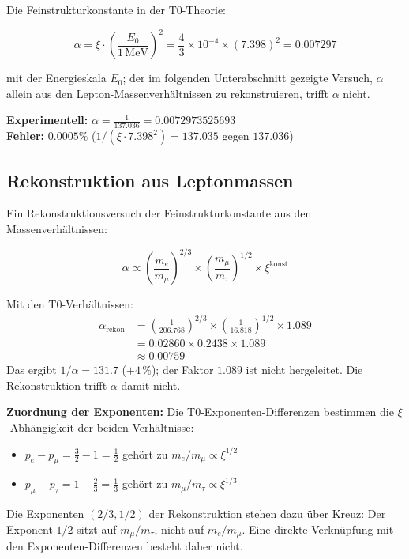 	Die Feinstrukturkonstante in der T0-Theorie:
	
	\begin{equation}
		\alpha = \xi \cdot \left(\frac{E_0}{1\,\text{MeV}}\right)^2 = \frac{4}{3} \times 10^{-4} \times (7.398)^2 = 0.007297
	\end{equation}
	
	mit der Energieskala $E_0$; der im folgenden Unterabschnitt gezeigte Versuch, $\alpha$ allein aus den Lepton-Massenverhältnissen zu rekonstruieren, trifft $\alpha$ nicht.
	
	\textbf{Experimentell:} $\alpha = \frac{1}{137.036} = 0.0072973525693$\\
	\textbf{Fehler:} $0.0005\%$ ($1/(\xi\cdot7.398^2) = 137.035$ gegen $137.036$)
	
	\subsection{Rekonstruktion aus Leptonmassen}
	
	\begin{beweis}
		Ein Rekonstruktionsversuch der Feinstrukturkonstante aus den Massenverhältnissen:
		
		\begin{equation}
			\alpha \propto \left(\frac{m_e}{m_\mu}\right)^{2/3} \times \left(\frac{m_\mu}{m_\tau}\right)^{1/2} \times \xi^{\text{konst}}
		\end{equation}
		
		Mit den T0-Verhältnissen:
		\begin{align}
			\alpha_{\text{rekon}} &= \left(\frac{1}{206.768}\right)^{2/3} \times \left(\frac{1}{16.818}\right)^{1/2} \times 1.089 \\
			&= 0.02860 \times 0.2438 \times 1.089 \\
			&\approx 0.00759
		\end{align}
		Das ergibt $1/\alpha = 131.7$ ($+4\,\%$); der Faktor $1.089$ ist nicht hergeleitet. Die Rekonstruktion trifft $\alpha$ damit nicht.
	\end{beweis}
	
	\textbf{Zuordnung der Exponenten:} Die T0-Exponenten-Differenzen bestimmen die $\xi$-Abhängigkeit der beiden Verhältnisse:
	\begin{itemize}
		\item $p_e - p_\mu = \frac{3}{2} - 1 = \frac{1}{2}$ gehört zu $m_e/m_\mu \propto \xi^{1/2}$
		\item $p_\mu - p_\tau = 1 - \frac{2}{3} = \frac{1}{3}$ gehört zu $m_\mu/m_\tau \propto \xi^{1/3}$
	\end{itemize}
	Die Exponenten $(2/3, 1/2)$ der Rekonstruktion stehen dazu über Kreuz: Der Exponent $1/2$ sitzt auf $m_\mu/m_\tau$, nicht auf $m_e/m_\mu$. Eine direkte Verknüpfung mit den Exponenten-Differenzen besteht daher nicht.

